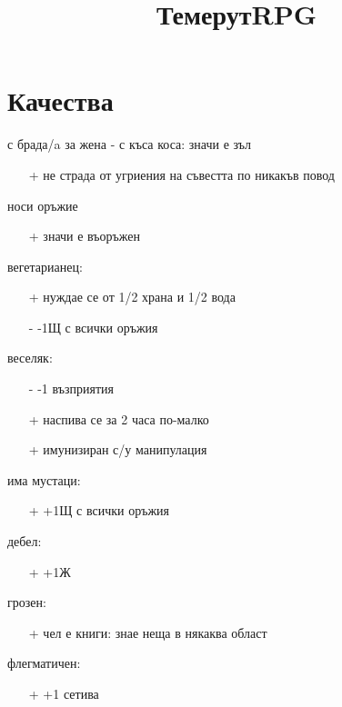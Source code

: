 \documentclass{article}
\title{ТемерутRPG}
\author{}
\begin{document}
\maketitle

\section{Качества}
с брада/a за жена - с къса коса: значи е зъл
\begin{itemize}
\item[+] не страда от угриения на съвестта по никакъв повод
\end{itemize}

носи оръжие
\begin{itemize}
\item[+] значи е въоръжен
\end{itemize}

вегетарианец:
\begin{itemize}
\item[+] нуждае се от 1/2 храна и 1/2 вода
\item[-] -1Щ с всички оръжия
\end{itemize}

веселяк:
\begin{itemize}
\item[-] -1 възприятия
\item[+] наспива се за 2 часа по-малко
\item[+] имунизиран с/у манипулация
\end{itemize}

има мустаци:
\begin{itemize}
\item[+] +1Щ с всички оръжия
\end{itemize}

дебел:
\begin{itemize}                                                                 
\item[+] +1Ж                                                    
\end{itemize}

грозен:
\begin{itemize}                                                                 
\item[+] чел е книги: знае неща в някаква област
\end{itemize}

флегматичен:
\begin{itemize}                                                                 
\item[+] +1 сетива                                                   
\end{itemize}
\end{document}
